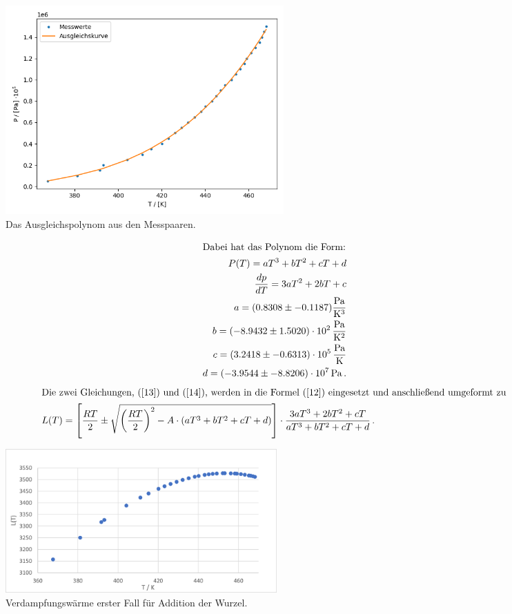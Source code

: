 \begin{figure}[H]  
    \centering
    \includegraphics[height=80mm]{bilder/plot2.png}
    \caption{Das Ausgleichspolynom aus den Messpaaren.\label{Abbildung6} }
\end{figure}

\begin{align}
    \intertext{Dabei hat das Polynom die Form:}
    P(T) = aT^{3} + bT^{2} +cT + d \label{13} \\
    \frac{dp}{dT} = 3aT^{2} + 2bT + c \label{14} \\
    a = (0.8308 \pm -0.1187) \frac{\unit{\pascal}}{\unit{\kelvin}^3}  \notag\\
    b = ( -8.9432 \pm 1.5020 ) \cdot 10^{2}\,\frac{\unit{\pascal}}{\unit{\kelvin}^2}   \notag\\
    c = ( 3.2418 \pm -0.6313 ) \cdot 10^{5}\,\frac{\unit{\pascal}}{\unit{\kelvin}} \notag\\
    d = ( -3.9544 \pm -8.8206 ) \cdot 10^{7}\,\unit{\pascal}\,.  \notag
\end{align}
\begin{align}
    \intertext{Die zwei Gleichungen, (\ref{13}) und (\ref{14}), werden in die Formel (\ref{12}) eingesetzt und anschließend umgeformt zu}
    L(T) = \left[ \frac{RT}{2} \pm \sqrt{\left(\frac{RT}{2}\right)^2 - A \cdot\left(aT^{3}+bT^{2}+cT+d\right)} \right] \cdot \frac{3aT^{3}+2bT^{2}+cT}{aT^{3}+bT^{2}+cT+d}\, .
\end{align}

\begin{figure}[H]       
    \centering
    \includegraphics[height=55mm]{bilder/plot3.png}
    \caption{Verdampfungswärme erster Fall für Addition der Wurzel.\label{Abbildung7} }
\end{figure}


